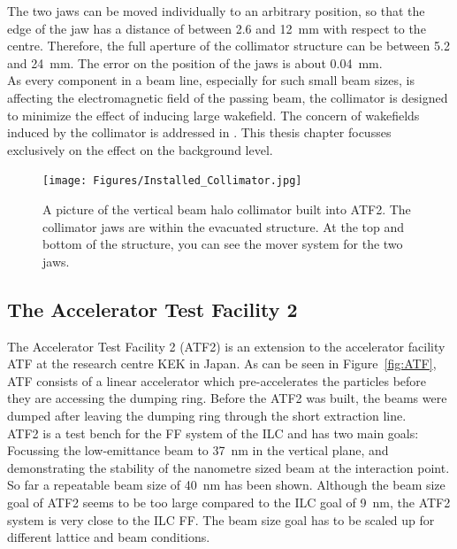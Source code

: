 The two jaws can be moved individually to an arbitrary position, so that the edge of the jaw has a distance of between 2.6 and \SI{12}{\milli\metre} with respect to the centre. Therefore, the full aperture of the collimator structure can be between 5.2 and \SI{24}{\milli\metre}. The error on the position of the jaws is about \SI{0.04}{\milli\metre}.\\
As every component in a beam line, especially for such small beam sizes, is affecting the electromagnetic field of the passing beam, the collimator is designed to minimize the effect of inducing large wakefield. The concern of wakefields induced by the collimator is addressed in \cite{NuriaCollimator2015}. This thesis chapter focusses exclusively on the effect on the background level.

\begin{figure}
\centering
\texttt{[image: Figures/Installed\_Collimator.jpg]}
\caption[Picture of the installed beam halo collimator]{A picture of the vertical beam halo collimator built into ATF2. The collimator jaws are within the evacuated structure. At the top and bottom of the structure, you can see the mover system for the two jaws.}
\label{fig:installed_collimator}
\end{figure}

\subsection{The Accelerator Test Facility 2}
\label{ATF2}

The Accelerator Test Facility 2 (ATF2) is an extension to the accelerator facility ATF at the research centre KEK in Japan. As can be seen in Figure~\ref{fig:ATF}, ATF consists of a linear accelerator which pre-accelerates the particles before they are accessing the dumping ring. Before the ATF2 was built, the beams were dumped after leaving the dumping ring through the short extraction line.\\ATF2 is a test bench for the FF system of the ILC and has two main goals: Focussing the low-emittance beam to \SI{37}{\nano\metre} in the vertical plane, and demonstrating the stability of the nanometre sized beam at the interaction point. So far a repeatable beam size of \SI{40}{\nano\metre} has been shown. Although the beam size goal of ATF2 seems to be too large compared to the ILC goal of \SI{9}{\nano\metre}, the ATF2 system is very close to the ILC FF. The beam size goal has to be scaled up for different lattice and beam conditions.

